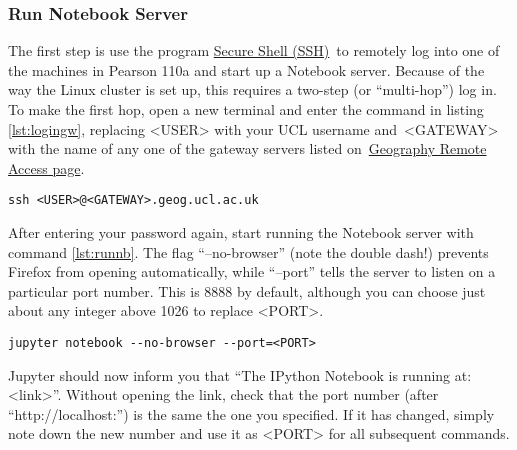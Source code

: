 \documentclass[a4paper]{article}
\begin{document}
\subsubsection{Run Notebook Server}

The first step is use the program \href{http://linuxcommand.org/man_pages/ssh1.html}{Secure Shell (SSH)}~to remotely log into one of the machines in Pearson 110a and start up a Notebook server.
Because of the way the Linux cluster is set up, this requires a two-step (or ``multi-hop'') log in.
To make the first hop, open a new terminal and enter the command in listing \ref{lst:logingw}, replacing \textless{}USER\textgreater{} with your UCL username and~\textless{}GATEWAY\textgreater{} with the name of any one of the gateway servers listed on~\href{http://www.geog.ucl.ac.uk/resources/computer-support/linux-remote-access}{Geography Remote Access page}.

\begin{lstlisting}[caption={Login to gateway}, label={lst:logingw}]
ssh <USER>@<GATEWAY>.geog.ucl.ac.uk
\end{lstlisting}

After entering your password again, start running the Notebook server with command \ref{lst:runnb}.
The flag ``--no-browser'' (note the double dash!) prevents Firefox from opening automatically, while ``--port'' tells the server to listen on a particular port number.
This is 8888 by default, although you can choose just about any integer above 1026 to replace \textless{}PORT\textgreater{}.

\begin{lstlisting}[caption={Run Notebook server}, label={lst:runnb}]
jupyter notebook --no-browser --port=<PORT>
\end{lstlisting}

Jupyter should now inform you that ``The IPython Notebook is running at: \textless{}link\textgreater{}''.
Without opening the link, check that the port number (after ``http://localhost:'') is the same the one you specified.
If it has changed, simply note down the new number and use it as \textless{}PORT\textgreater{} for all subsequent commands. 
\end{document}
